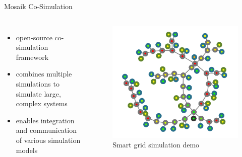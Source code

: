 \begin{frame}{Mosaik Co-Simulation}
    \begin{columns}
        \begin{itemize}
            \item open-source co-simulation framework
            \item combines multiple simulations to simulate large, complex systems
            \item enables integration and communication of various simulation models
        \end{itemize}
        \begin{figure}
            \centering
            \includegraphics[height=.8\textwidth]{../../sim_example}
            \caption{Smart grid simulation demo}
            \label{fig:sim_example}
        \end{figure}
    \end{columns}
\end{frame}
